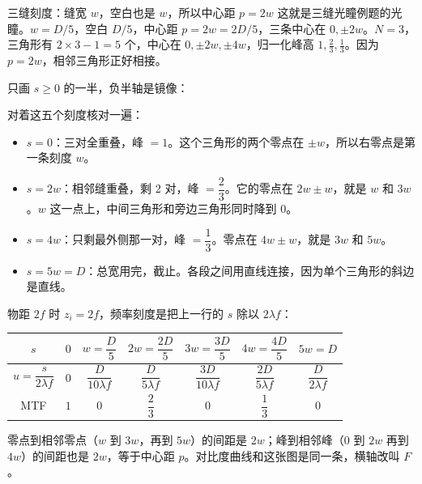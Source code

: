 \begin{exam}{三缝刻度：缝宽 $w$，空白也是 $w$，所以中心距 $p=2w$}
这就是三缝光瞳例题的光瞳。$w=D/5$，空白 $D/5$，中心距 $p=2w=2D/5$，三条中心在 $0,\pm 2w$。$N=3$，三角形有 $2\times3-1=5$ 个，中心在 $0,\pm 2w,\pm 4w$，归一化峰高 $1,\frac23,\frac13$。因为 $p=2w$，相邻三角形正好相接。

只画 $s\ge 0$ 的一半，负半轴是镜像：

\begin{center}
\end{center}

对着这五个刻度核对一遍：
\begin{itemize}
\item $s=0$：三对全重叠，峰 $=1$。这个三角形的两个零点在 $\pm w$，所以右零点是第一条刻度 $w$。
\item $s=2w$：相邻缝重叠，剩 2 对，峰 $=\dfrac23$。它的零点在 $2w\pm w$，就是 $w$ 和 $3w$。$w$ 这一点上，中间三角形和旁边三角形同时降到 0。
\item $s=4w$：只剩最外侧那一对，峰 $=\dfrac13$。零点在 $4w\pm w$，就是 $3w$ 和 $5w$。
\item $s=5w=D$：总宽用完，截止。各段之间用直线连接，因为单个三角形的斜边是直线。
\end{itemize}
物距 $2f$ 时 $z_i=2f$，频率刻度是把上一行的 $s$ 除以 $2\lambda f$：

\begin{center}\renewcommand{\arraystretch}{1.25}
\begin{tabular}{c|cccccc}
$s$ & $0$ & $w=\dfrac D5$ & $2w=\dfrac{2D}5$ & $3w=\dfrac{3D}5$ & $4w=\dfrac{4D}5$ & $5w=D$\\ \hline
$u=\dfrac{s}{2\lambda f}$ & $0$ & $\dfrac{D}{10\lambda f}$ & $\dfrac{D}{5\lambda f}$ & $\dfrac{3D}{10\lambda f}$ & $\dfrac{2D}{5\lambda f}$ & $\dfrac{D}{2\lambda f}$\\
MTF & $1$ & $0$ & $\dfrac23$ & $0$ & $\dfrac13$ & $0$
\end{tabular}
\end{center}
零点到相邻零点（$w$ 到 $3w$，再到 $5w$）的间距是 $2w$；峰到相邻峰（$0$ 到 $2w$ 再到 $4w$）的间距也是 $2w$，等于中心距 $p$。对比度曲线和这张图是同一条，横轴改叫 $F$。
\end{exam}

